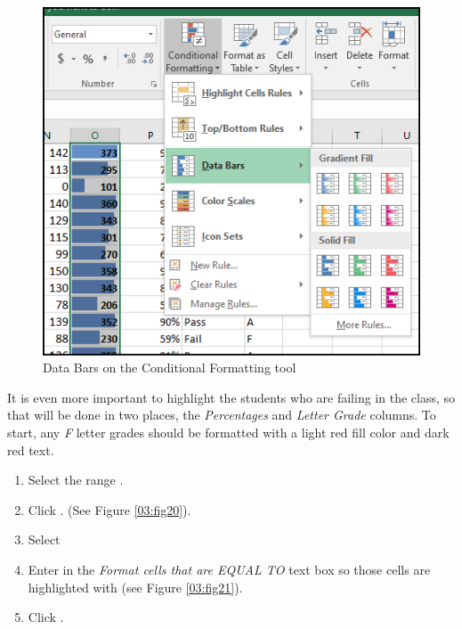 \begin{figure}[H]
	\centering
	\includegraphics[width=\maxwidth{.95\linewidth}]{gfx/ch03_fig19}
	\caption{Data Bars on the Conditional Formatting tool}
	\label{03:fig19}
\end{figure}

It is even more important to highlight the students who are failing in the class, so that will be done in two places, the \textit{Percentages} and \textit{Letter Grade} columns. To start, any \textit{F} letter grades should be formatted with a light red fill color and dark red text.

\begin{enumerate}
	\item Select the range .
	\item Click . (See Figure \ref{03:fig20}).
	\item Select 
	\item Enter  in the \textit{Format cells that are EQUAL TO} text box so those cells are highlighted with  (see Figure \ref{03:fig21}).
	\item Click .
\end{enumerate}


